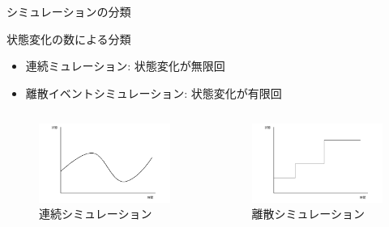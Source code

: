 \documentclass[dvipdfmx,uplatex,11pt]{beamer}
\theoremstyle{definition}
\begin{document}
\begin{frame}{シミュレーションの分類}
  \begin{block}{状態変化の数による分類}

    \begin{itemize}
      \item 連続ミュレーション:  状態変化が無限回
      \item 離散イベントシミュレーション:  状態変化が有限回
    \end{itemize}
  \end{block}

  \begin{columns}
  
    \begin{column}{0.5\textwidth}
      
      \begin{figure}[htb]
        \centering
        \includegraphics[scale=0.3]{continuous_sim.png}
        \caption{ \small 連続シミュレーション}
      \end{figure}
    \end{column}

    \begin{column}{0.5\textwidth}
      
      \begin{figure}[htb]
        \centering
      \includegraphics[scale=0.3]{discrete_sim.png}
        \caption{\small 離散シミュレーション}
      \end{figure}
    \end{column}
  
  \end{columns}
\end{frame}
\end{document}
